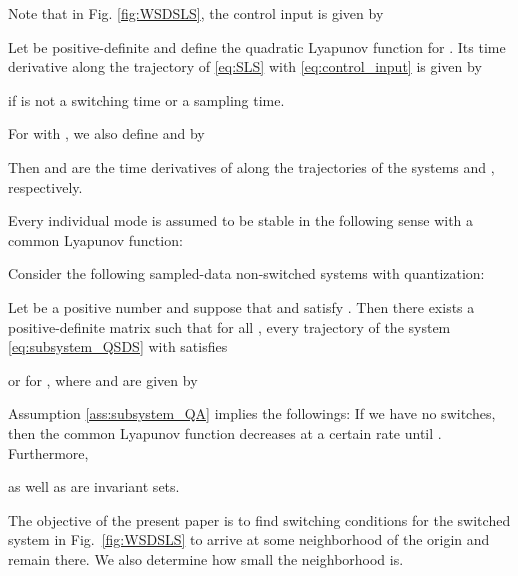 \documentclass[a4, 11pt]{article}
\begin{document}
Note that in Fig. \ref{fig:WSDSLS}, the control input  is given by


Let  be positive-definite and 
define the quadratic Lyapunov function
 for .
Its time derivative  along the trajectory of \eqref{eq:SLS} with \eqref{eq:control_input}
is given by

if  is not a switching time or a sampling time.

For  with , 
we also define  and  by

Then
 and  are the time derivatives of 
along the trajectories of the systems  and , 
respectively.

Every individual mode is assumed to be 
stable in the following sense with
a common Lyapunov function:
\begin{assumption}
\label{ass:subsystem_QA}
Consider 
the following sampled-data non-switched systems with quantization:

Let  be a positive number and
suppose that  and  satisfy . Then
there exists a positive-definite matrix 
such that for all , every trajectory  of the system
\eqref{eq:subsystem_QSDS} with 
satisfies

or  for ,
where  and 
are given by

\end{assumption}

Assumption \ref{ass:subsystem_QA} implies the followings:
If we have no switches, then the
common Lyapunov function  decreases
at a certain rate until
. 
Furthermore,

as well as
 are invariant sets.

The objective of the present paper is to
find switching conditions for the switched system in Fig.~\ref{fig:WSDSLS} 
to arrive at some neighborhood of the origin and remain there. 
We also determine how small the neighborhood is.
\end{document}
